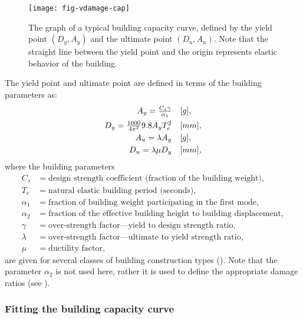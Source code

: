\begin{figure}[htp]
\centering
{}
\texttt{[image: fig-vdamage-cap]}
\caption{The graph of a typical building capacity
curve, defined by
  the yield point $(D_y, A_y)$ and the ultimate point $(D_u, A_u)$.
  Note that the straight line between the yield point and the origin
  represents elastic behavior of the building. }
\label{fig:vdamage-cap}
\end{figure}


The yield point and ultimate point are defined in terms of the
building parameters as: $$ \begin{array}{rl}
 A_y = \frac{C_s\gamma}{\alpha_1} & [g],  \vspace{0.5em} \\
 D_y = \frac{1000}{4\pi^2}9.8A_y T_e^2 & [mm],\vspace{0.3em} \\
 A_u = \lambda A_y & [g], \vspace{0.3em} \\
 D_u = \lambda\mu D_y & [mm], \\
 \end{array}
$$
where the building parameters
\begin{align*}
C_s &= \text{design strength coefficient (fraction of the building weight)},\\
T_e &= \text{natural elastic building period (seconds)},\\
\alpha_1 &= \text{fraction of building weight participating in the
  first mode},\\
\alpha_2 &= \text{fraction of the effective building height to
building displacement},\\
\gamma &= \text{over-strength factor---yield to design strength ratio},\\
\lambda &= \text{over-strength factor---ultimate to yield strength ratio},\\
\mu &= \text{ductility factor},
\end{align*}
are given for several classes of building construction types
(). Note that the parameter
$\alpha_2$ is not used here, rather it is used to define the
appropriate damage ratios (see ).


\subsubsection{Fitting the building capacity curve}

